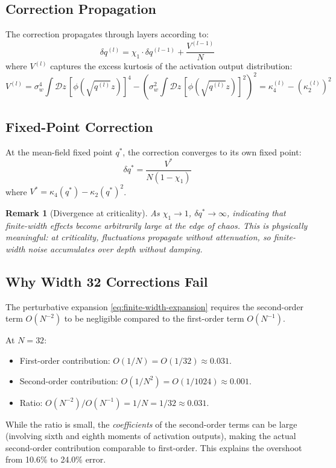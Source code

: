 \documentclass[10pt]{article}
\newtheorem{remark}[theorem]{Remark}
\begin{document}
\subsection{Correction Propagation}

The correction propagates through layers according to:
\begin{equation}
    \delta q^{(l)} = \chi_1 \cdot \delta q^{(l-1)} + \frac{V^{(l-1)}}{N}
    \label{eq:correction-propagation}
\end{equation}
where $V^{(l)}$ captures the excess kurtosis of the activation output distribution:
\begin{equation}
    V^{(l)} = \sigma_w^4 \int \mathcal{D}z\, [\phi(\sqrt{q^{(l)}} z)]^4 - \left(\sigma_w^2 \int \mathcal{D}z\, [\phi(\sqrt{q^{(l)}} z)]^2\right)^2 = \kappa_4^{(l)} - (\kappa_2^{(l)})^2
\end{equation}

\subsection{Fixed-Point Correction}

At the mean-field fixed point $q^*$, the correction converges to its own fixed point:
\begin{equation}
    \delta q^* = \frac{V^*}{N(1 - \chi_1)}
    \label{eq:correction-fixed-point}
\end{equation}
where $V^* = \kappa_4(q^*) - \kappa_2(q^*)^2$.

\begin{remark}[Divergence at criticality]
As $\chi_1 \to 1$, $\delta q^* \to \infty$, indicating that finite-width effects become arbitrarily large at the edge of chaos.
This is physically meaningful: at criticality, fluctuations propagate without attenuation, so finite-width noise accumulates over depth without damping.
\end{remark}

\subsection{Why Width 32 Corrections Fail}

The perturbative expansion \eqref{eq:finite-width-expansion} requires the second-order term $O(N^{-2})$ to be negligible compared to the first-order term $O(N^{-1})$.

At $N = 32$:
\begin{itemize}[nosep]
    \item First-order contribution: $O(1/N) = O(1/32) \approx 0.031$.
    \item Second-order contribution: $O(1/N^2) = O(1/1024) \approx 0.001$.
    \item Ratio: $O(N^{-2})/O(N^{-1}) = 1/N = 1/32 \approx 0.031$.
\end{itemize}
While the ratio is small, the \emph{coefficients} of the second-order terms can be large (involving sixth and eighth moments of activation outputs), making the actual second-order contribution comparable to first-order.
This explains the overshoot from 10.6\% to 24.0\% error.
\end{document}
